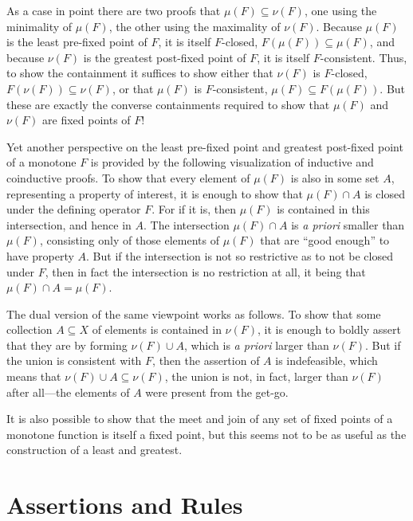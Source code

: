 \documentclass[11pt,twoside]{article}
\begin{document}
As a case in point there are two proofs that $\mu(F)\subseteq\nu(F)$, one using the minimality of
$\mu(F)$, the other using the maximality of $\nu(F)$.  Because $\mu(F)$ is the least pre-fixed
point of $F$, it is itself $F$-closed, $F(\mu(F))\subseteq\mu(F)$, and because $\nu(F)$ is the greatest
post-fixed point of $F$, it is itself $F$-consistent.  Thus, to show the containment it
suffices to show either that $\nu(F)$ is $F$-closed, $F(\nu(F))\subseteq\nu(F)$, or that
$\mu(F)$ is $F$-consistent, $\mu(F)\subseteq F(\mu(F))$.  But these are exactly the converse
containments required to show that $\mu(F)$ and $\nu(F)$ are fixed points of $F$!

\smallskip

Yet another perspective on the least pre-fixed point and greatest post-fixed point of a
monotone $F$ is provided by the following visualization of inductive and coinductive
proofs.  To show that every element of $\mu(F)$ is also in some set $A$, representing a
property of interest, it is enough to show that $\mu(F)\cap A$ is closed under the defining
operator $F$.  For if it is, then $\mu(F)$ is contained in this intersection, and hence in
$A$.  The intersection $\mu(F)\cap A$ is \emph{a priori} smaller than $\mu(F)$, consisting only
of those elements of $\mu(F)$ that are ``good enough'' to have property $A$.  But if the
intersection is not so restrictive as to not be closed under $F$, then in fact the
intersection is no restriction at all, it being that $\mu(F)\cap A=\mu(F)$.

The dual version of the same viewpoint works as follows.  To show that some collection
$A\subseteq X$ of elements is contained in $\nu(F)$, it is enough to boldly assert that they are by
forming $\nu(F)\cup A$, which is \emph{a priori} larger than $\nu(F)$.  But if the union is
consistent with $F$, then the assertion of $A$ is indefeasible, which means that
$\nu(F)\cup A\subseteq\nu(F)$, the union is not, in fact, larger than $\nu(F)$ after all---the elements of
$A$ were present from the get-go.

\smallskip

It is also possible to show that the meet and join of any set of fixed points of a
monotone function is itself a fixed point, but this seems not to be as useful as the
construction of a least and greatest.

\section{Assertions and Rules}
\end{document}

